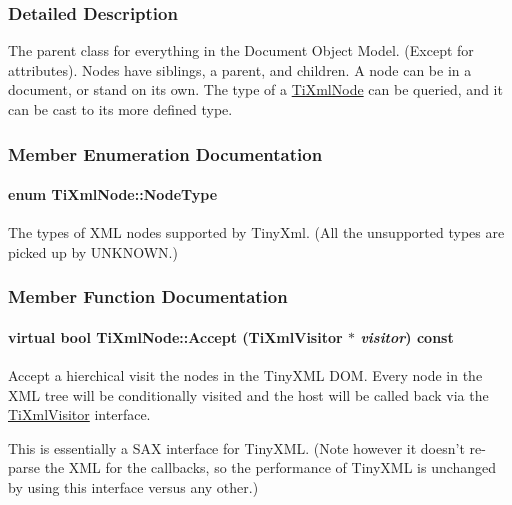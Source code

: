 \subsubsection{Detailed Description}
The parent class for everything in the Document Object Model. (Except for attributes). Nodes have siblings, a parent, and children. A node can be in a document, or stand on its own. The type of a \hyperlink{class_ti_xml_node}{TiXmlNode} can be queried, and it can be cast to its more defined type. 

\subsubsection{Member Enumeration Documentation}
\hypertarget{class_ti_xml_node_a836eded4920ab9e9ef28496f48cd95a2}{
\paragraph[{NodeType}]{\setlength{\rightskip}{0pt plus 5cm}enum {\bf TiXmlNode::NodeType}}\hfill}
\label{class_ti_xml_node_a836eded4920ab9e9ef28496f48cd95a2}
The types of XML nodes supported by TinyXml. (All the unsupported types are picked up by UNKNOWN.) 

\subsubsection{Member Function Documentation}
\hypertarget{class_ti_xml_node_acc0f88b7462c6cb73809d410a4f5bb86}{
\paragraph[{Accept}]{\setlength{\rightskip}{0pt plus 5cm}virtual bool TiXmlNode::Accept ({\bf TiXmlVisitor} $\ast$ {\em visitor}) const}\hfill}
\label{class_ti_xml_node_acc0f88b7462c6cb73809d410a4f5bb86}
Accept a hierchical visit the nodes in the TinyXML DOM. Every node in the XML tree will be conditionally visited and the host will be called back via the \hyperlink{class_ti_xml_visitor}{TiXmlVisitor} interface.

This is essentially a SAX interface for TinyXML. (Note however it doesn't re-\/parse the XML for the callbacks, so the performance of TinyXML is unchanged by using this interface versus any other.)

